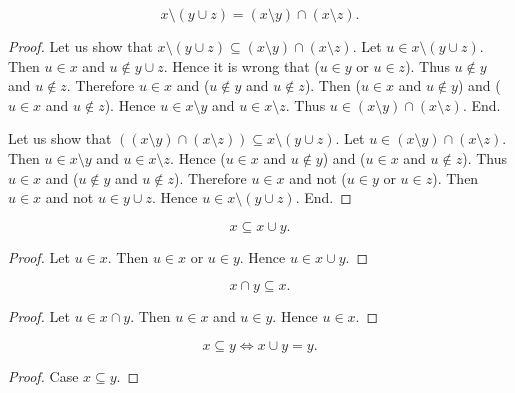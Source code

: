 \documentclass[../../sets-and-functions.ftl.tex]{subfiles}
\begin{document}
\begin{forthel}
    \begin{proposition}[SF 01 01 403962]
      $$x \setminus (y \cup z) = (x \setminus y) \cap (x \setminus z).$$
    \end{proposition}
    \begin{proof}
      Let us show that $x \setminus (y \cup z) \subseteq (x \setminus y) \cap
      (x \setminus z)$.
        Let $u \in x \setminus (y \cup z)$.
        Then $u \in x$ and $u \notin y \cup z$.
        Hence it is wrong that ($u \in y$ or $u \in z$).
        Thus $u \notin y$ and $u \notin z$.
        Therefore $u \in x$ and ($u \notin y$ and $u \notin z$).
        Then ($u \in x$ and $u \notin y$) and ($u \in x$ and $u \notin z$).
        Hence $u \in x \setminus y$ and $u \in x \setminus z$.
        Thus $u \in (x \setminus y) \cap (x \setminus z)$.
      End.

      Let us show that $((x \setminus y) \cap (x \setminus z)) \subseteq
      x \setminus (y \cup z)$.
        Let $u \in (x \setminus y) \cap (x \setminus z)$.
        Then $u \in x \setminus y$ and $u \in x \setminus z$.
        Hence ($u \in x$ and $u \notin y$) and ($u \in x$ and $u \notin z$).
        Thus $u \in x$ and ($u \notin y$ and $u \notin z$).
        Therefore $u \in x$ and not ($u \in y$ or $u \in z$).
        Then $u \in x$ and not $u \in y \cup z$.
        Hence $u \in x \setminus (y \cup z)$.
      End.
    \end{proof}

    \begin{proposition}[SF 01 01 628970]
      $$x \subseteq x \cup y.$$
    \end{proposition}
    \begin{proof}
      Let $u \in x$.
      Then $u \in x$ or $u \in y$.
      Hence $u \in x \cup y$.
    \end{proof}


    \begin{proposition}[SF 01 01 368515]
      $$x \cap y \subseteq x.$$
    \end{proposition}
    \begin{proof}
      Let $u \in x \cap y$.
      Then $u \in x$ and $u \in y$.
      Hence $u \in x$.
    \end{proof}


    \begin{proposition}[SF 01 01 591527]
      $$x \subseteq y \iff x \cup y = y.$$
    \end{proposition}
    \begin{proof}
      Case $x \subseteq y$.


\end{proof}
\end{forthel}
\end{document}
